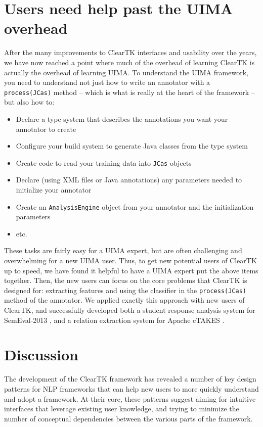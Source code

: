\documentclass[10pt, a4paper]{article}
\newcommand{\code}[1]{\texttt{\small #1}}
\begin{document}
\section{Users need help past the UIMA overhead}
After the many improvements to ClearTK interfaces and usability over the years, we have now reached a point where much of the overhead of learning ClearTK is actually the overhead of learning UIMA.
To understand the UIMA framework, you need to understand not just how to write an annotator with a \code{process(JCas)} method -- which is what is really at the heart of the framework -- but also how to:
\begin{itemize}
\item Declare a type system that describes the annotations you want your annotator to create
\item Configure your build system to generate Java classes from the type system
\item Create code to read your training data into \code{JCas} objects
\item Declare (using XML files or Java annotations) any parameters needed to initialize your annotator
\item Create an \code{AnalysisEngine} object from your annotator and the initialization parameters
\item etc.
\end{itemize}
These tasks are fairly easy for a UIMA expert, but are often challenging and overwhelming for a new UIMA user.
Thus, to get new potential users of ClearTK up to speed, we have found it helpful to have a UIMA expert put the above items together.
Then, the new users can focus on the core problems that ClearTK is designed for: extracting features and using the classifier in the \code{process(JCas)} method of the annotator.
We applied exactly this approach with new users of ClearTK, and successfully developed both a student response analysis system for SemEval-2013 \cite{okoye-bethard-sumner:2013:SemEval-2013}, and a relation extraction system for Apache cTAKES \cite{dligach2013discovering}.

\section{Discussion}
The development of the ClearTK framework has revealed a number of key design patterns for NLP frameworks that can help new users to more quickly understand and adopt a framework.
At their core, these patterns suggest aiming for intuitive interfaces that leverage existing user knowledge, and trying to minimize the number of conceptual dependencies between the various parts of the framework.
\end{document}
